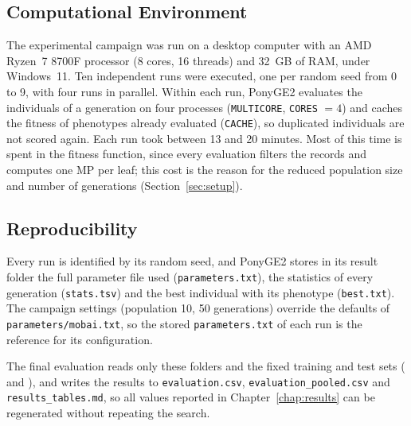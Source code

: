 \subsection{Computational Environment}

The experimental campaign was run on a desktop computer with an AMD Ryzen~7 8700F processor (8 cores, 16 threads) and 32~GB of RAM, under Windows~11.
Ten independent runs were executed, one per random seed from 0 to 9, with four runs in parallel.
Within each run, PonyGE2 evaluates the individuals of a generation on four processes (\texttt{MULTICORE}, \texttt{CORES} $= 4$) and caches the fitness of phenotypes already evaluated (\texttt{CACHE}), so duplicated individuals are not scored again.
Each run took between 13 and 20 minutes.
Most of this time is spent in the fitness function, since every evaluation filters the records and computes one \ac{MP} per leaf; this cost is the reason for the reduced population size and number of generations (Section~\ref{sec:setup}).

\subsection{Reproducibility}

Every run is identified by its random seed, and PonyGE2 stores in its result folder the full parameter file used (\texttt{parameters.txt}), the statistics of every generation (\texttt{stats.tsv}) and the best individual with its phenotype (\texttt{best.txt}).
The campaign settings (population 10, 50 generations) override the defaults of \texttt{parameters/mobai.txt}, so the stored \texttt{parameters.txt} of each run is the reference for its configuration.
\begin{sloppypar}
The final evaluation reads only these folders and the fixed training and test sets ( and ), and writes the results to \texttt{evaluation.csv}, \texttt{evaluation\_pooled.csv} and \texttt{results\_tables.md}, so all values reported in Chapter~\ref{chap:results} can be regenerated without repeating the search.
\end{sloppypar}
